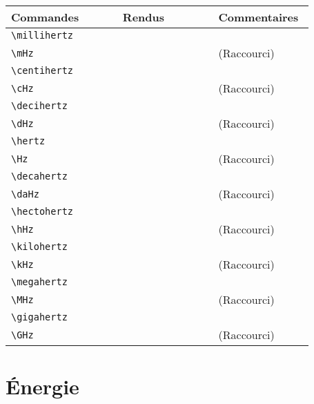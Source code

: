 \documentclass[a4paper,12pt]{article}
\newcommand{\rac}{({\color{red}Raccourci})}
\begin{document}
	\noindent
	\begin{tabular}{|p{0.35\linewidth}|p{0.3\linewidth}|p{0.3\linewidth}|}
		\hline
 			\textbf{Commandes}&\textbf{Rendus}&\textbf{Commentaires}
 		\\\hline\hline
			\verb!\millihertz!	& 	\millihertz	&	\\
		\hline
			\verb!\mHz!		& 	\mHz	&	\rac\\
		\hline
			\verb!\centihertz!	& 	\centihertz	&	\\
		\hline
			\verb!\cHz!		& 	\cHz	&	\rac\\
		\hline
			\verb!\decihertz!	& 	\decihertz	&	\\
		\hline
			\verb!\dHz!		& 	\dHz	&	\rac\\
		\hline
			\verb!\hertz!		& 	\hertz	&	\\
		\hline
			\verb!\Hz!		& 	\Hz	&	\rac\\
		\hline
			\verb!\decahertz!	& 	\decahertz		&	\\
		\hline
			\verb!\daHz!		& 	\daHz	&	\rac\\
		\hline
			\verb!\hectohertz!	& 	\hectohertz	&	\\
		\hline
			\verb!\hHz!		& 	\hHz		&	\rac\\
		\hline
			\verb!\kilohertz!	& 	\kilohertz	&	\\
		\hline
			\verb!\kHz!		& 	\kHz		&	\rac\\
		\hline
			\verb!\megahertz!	& 	\megahertz	&	\\
		\hline
			\verb!\MHz!		& 	\MHz		&	\rac\\
		\hline
			\verb!\gigahertz!	& 	\gigahertz	&	\\
		\hline
			\verb!\GHz!		& 	\GHz		&	\rac\\
		\hline
	\end{tabular}

	\section{Énergie}
\end{document}
